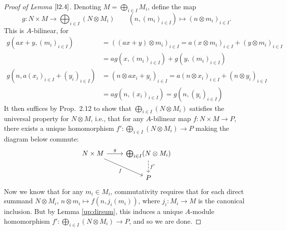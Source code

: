 \documentclass[12pt,letterpaper]{article}
\theoremstyle{definition}
\theoremstyle{remark}
\numberwithin{figure}{problem}
\numberwithin{equation}{section}
\begin{document}
\begin{proof}[Proof of Lemma $\ref{l2.4}$]
  Denoting $M = \bigoplus_{i \in I}M_i$, define the map
  \begin{equation*}
    g \colon N \times M \to \bigoplus_{i \in I}(N \otimes M_i) \qquad (n,(m_i)_{i\in I}) \mapsto (n \otimes m_i)_{i \in I}.
  \end{equation*}
  This is $A$-bilinear, for
  \begin{align*}
    g(ax+y,(m_i)_{i\in I}) &= ((ax+y) \otimes m_i)_{i \in I} = a(x \otimes m_i)_{i \in I} + (y \otimes m_i)_{i \in I}\\
    &= ag(x,(m_i)_{i\in I}) + g(y,(m_i)_{i\in I})\\
    g(n,a(x_i)_{i\in I}+(y_i)_{i\in I}) &= (n \otimes ax_i+y_i)_{i\in I} = a(n \otimes x_i)_{i \in I} + (n \otimes y_i)_{i \in I}\\
    &= ag(n,(x_i)_{i\in I}) = g(n,(y_i)_{i\in I})
  \end{align*}
  It then suffices by Prop.~2.12 to show that $\bigoplus_{i \in I}(N \otimes M_i)$ satisfies the universal property for $N \otimes M$, i.e., that for any $A$-bilinear map $f\colon N \times M \to P$, there exists a unique homomorphism $f'\colon \bigoplus_{i \in I}(N \otimes M_i) \to P$ making the diagram below commute:
  \begin{equation*}
    \begin{tikzcd}
      N \times M \rar{g}\arrow{dr}[swap]{f} & \bigoplus_{i \in I}(N \otimes M_i)\dar[dashed]{f'}\\
      & P
    \end{tikzcd}
  \end{equation*}
  Now we know that for any $m_i \in M_i$, commutativity requires that for each direct summand $N \otimes M_i$, $n \otimes m_i \mapsto f(n,j_i(m_i))$, where $j_i \colon M_i \to M$ is the canonical inclusion. But by Lemma \ref{up:dirsum}, this induces a unique $A$-module homomorphism $f' \colon \bigoplus_{i \in I}(N \otimes M_i) \to P$, and so we are done.
\end{proof}
\end{document}
